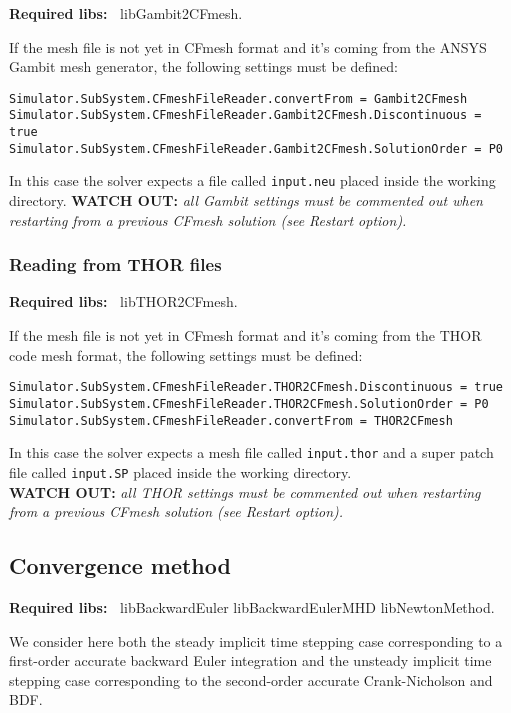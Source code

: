 \documentclass[11pt]{article}
\begin{document}
{\bf Required libs:~} libGambit2CFmesh.

If the mesh file is not yet in CFmesh format and it's coming from the ANSYS Gambit mesh generator,
the following settings must be defined:  

\begin{lstlisting}[breaklines]
Simulator.SubSystem.CFmeshFileReader.convertFrom = Gambit2CFmesh
Simulator.SubSystem.CFmeshFileReader.Gambit2CFmesh.Discontinuous = true
Simulator.SubSystem.CFmeshFileReader.Gambit2CFmesh.SolutionOrder = P0
\end{lstlisting}
In this case the solver expects a file called {\tt input.neu} placed inside the working directory.
{\bf WATCH OUT:} {\it all Gambit settings must be commented out when restarting from a previous CFmesh solution 
  (see Restart option).}

\subsubsection{Reading from THOR files}

{\bf Required libs:~} libTHOR2CFmesh.

If the mesh file is not yet in CFmesh format and it's coming from the THOR code mesh format,
the following settings must be defined:

\begin{lstlisting}[breaklines]
Simulator.SubSystem.CFmeshFileReader.THOR2CFmesh.Discontinuous = true
Simulator.SubSystem.CFmeshFileReader.THOR2CFmesh.SolutionOrder = P0
Simulator.SubSystem.CFmeshFileReader.convertFrom = THOR2CFmesh
\end{lstlisting}
In this case the solver expects a mesh file called {\tt input.thor} and a super patch file called {\tt input.SP} placed inside the working directory.\\
{\bf WATCH OUT:} {\it all THOR settings must be commented out when restarting from a previous CFmesh solution
  (see Restart option).}

\subsection{Convergence method}

{\bf Required libs:~} libBackwardEuler libBackwardEulerMHD libNewtonMethod.

We consider here both the steady implicit time stepping case corresponding to a first-order accurate backward Euler integration and the unsteady implicit time stepping case corresponding to the second-order accurate Crank-Nicholson and BDF.
\end{document}
